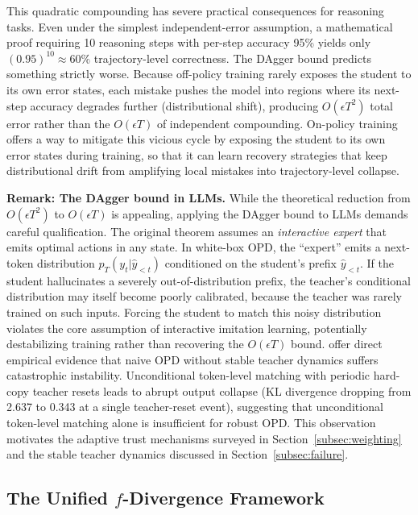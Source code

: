 \documentclass{article} %
\newcommand{\pteacher}{p_T}
\begin{document}
This quadratic compounding has severe practical consequences for reasoning tasks. Even under the simplest independent-error assumption, a mathematical proof requiring 10 reasoning steps with per-step accuracy 95\% yields only $(0.95)^{10} \approx 60\%$ trajectory-level correctness. The DAgger bound predicts something strictly worse. Because off-policy training rarely exposes the student to its own error states, each mistake pushes the model into regions where its next-step accuracy degrades further (distributional shift), producing $O(\epsilon T^2)$ total error rather than the $O(\epsilon T)$ of independent compounding. On-policy training offers a way to mitigate this vicious cycle by exposing the student to its own error states during training, so that it can learn recovery strategies that keep distributional drift from amplifying local mistakes into trajectory-level collapse.

\textbf{Remark: The DAgger bound in LLMs.} While the theoretical reduction from $O(\epsilon T^2)$ to $O(\epsilon T)$ is appealing, applying the DAgger bound to LLMs demands careful qualification. The original theorem assumes an \emph{interactive expert} that emits optimal actions in any state. In white-box OPD, the ``expert'' emits a next-token distribution $\pteacher(y_t | \hat{y}_{<t})$ conditioned on the student's prefix $\hat{y}_{<t}$. If the student hallucinates a severely out-of-distribution prefix, the teacher's conditional distribution may itself become poorly calibrated, because the teacher was rarely trained on such inputs. Forcing the student to match this noisy distribution violates the core assumption of interactive imitation learning, potentially destabilizing training rather than recovering the $O(\epsilon T)$ bound. \citet{2605.02943} offer direct empirical evidence that naive OPD without stable teacher dynamics suffers catastrophic instability. Unconditional token-level matching with periodic hard-copy teacher resets leads to abrupt output collapse (KL divergence dropping from 2.637 to 0.343 at a single teacher-reset event), suggesting that unconditional token-level matching alone is insufficient for robust OPD. This observation motivates the adaptive trust mechanisms surveyed in Section~\ref{subsec:weighting} and the stable teacher dynamics discussed in Section~\ref{subsec:failure}.

\subsection{The Unified \texorpdfstring{$f$}{f}-Divergence Framework}
\label{subsec:f-div}
\end{document}
